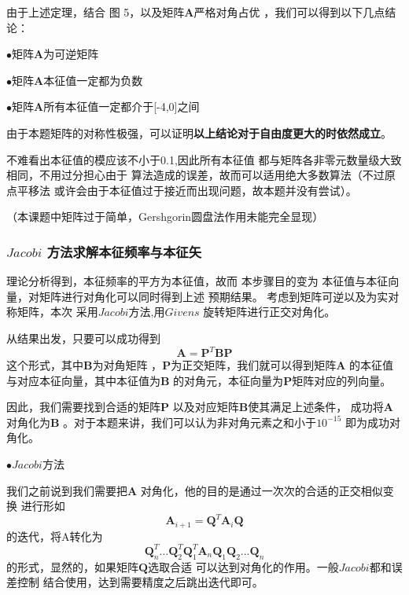 \documentclass[11pt, a4paper, oneside]{ctexart}
\begin{document}
{{{由于上述定理，结合
图 5，以及矩阵$\boldsymbol{A}$严格对角占优
，我们可以得到以下几点结论：

$\bullet$矩阵$\boldsymbol{A}$为可逆矩阵

$\bullet$矩阵$\boldsymbol{A}$本征值一定都为负数

$\bullet$矩阵$\boldsymbol{A}$所有本征值一定都介于[-4,0]之间

由于本题矩阵的对称性极强，可以证明\cite{a}\textbf{以上结论对于自由度更大的时依然成立}。

不难看出本征值的模应该不小于0.1,因此所有本征值
都与矩阵各非零元数量级大致相同，不用过分担心由于
算法造成的误差，故而可以适用绝大多数算法（不过原点平移法
或许会由于本征值过于接近而出现问题，故本题并没有尝试）。

（本课题中矩阵过于简单，Gershgorin圆盘法作用未能完全显现）

    


        

\subsubsection{$Jacobi$ 方法求解本征频率与本征矢}

理论分析得到，本征频率的平方为本征值，故而
本步骤目的变为
本征值与本征向量，对矩阵进行对角化可以同时得到上述
预期结果。
考虑到矩阵可逆以及为实对称矩阵，本次
采用$Jacobi$方法,用$Givens$
旋转矩阵进行正交对角化。

从结果出发，只要可以成功得到
$$\boldsymbol{A}=\boldsymbol P^T \boldsymbol B \boldsymbol P$$
这个形式，其中$\boldsymbol B$为对角矩阵
，$\boldsymbol P$为正交矩阵，我们就可以得到矩阵$\boldsymbol A$
的本征值与对应本征向量，其中本征值为$\boldsymbol B$
的对角元，本征向量为$\boldsymbol P$矩阵对应的列向量。

因此，我们需要找到合适的矩阵$\boldsymbol P$
以及对应矩阵$\boldsymbol B$使其满足上述条件，
成功将$\boldsymbol A$对角化为$\boldsymbol B$
。对于本题来讲，我们可以认为非对角元素之和小于$10^{-15}$
即为成功对角化。

$\bullet Jacobi$方法

我们之前说到我们需要把$\boldsymbol A$
对角化，他的目的是通过一次次的合适的正交相似变换
进行形如
$$\boldsymbol A_{i+1}=\boldsymbol 
Q^T \boldsymbol {A}_i \boldsymbol Q$$
的迭代，将A转化为
$$\boldsymbol Q_n^T \dots\boldsymbol Q_2^T \boldsymbol Q_1^T 
\boldsymbol {A}_n 
\boldsymbol Q_1\boldsymbol Q_2\dots \boldsymbol Q_n$$
的形式，显然的，如果矩阵$\boldsymbol Q$选取合适
可以达到对角化的作用。一般$Jacobi$都和误差控制
结合使用，达到需要精度之后跳出迭代即可。

}}}
\end{document}
